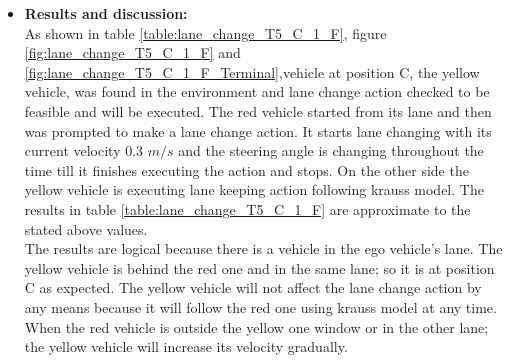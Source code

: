 \begin{enumerate}
\begin{itemize}
             \item \textbf{Results and discussion:} \\
                       As shown in table \ref{table:lane_change_T5_C_1_F}, figure \ref{fig:lane_change_T5_C_1_F} and \ref{fig:lane_change_T5_C_1_F_Terminal},vehicle at position C, the yellow vehicle, was found in the environment and lane change action checked to be feasible and will be executed. The red vehicle started from its lane and then was prompted to make a lane change action. It starts lane changing with its current velocity 0.3 \(m/s\) and the steering angle is changing throughout the time till it finishes executing the action and stops. On the other side the yellow vehicle is executing lane keeping action following krauss model. The results in table \ref{table:lane_change_T5_C_1_F} are approximate to the stated above values.\\
                        The results are logical because there is a vehicle in the ego vehicle's lane. The yellow vehicle is behind the red one and in the same lane; so it is at position C as expected. The yellow vehicle will not affect the lane change action by any means because it will follow the red one using krauss model at any time. When the red vehicle is outside the yellow one window or in the other lane; the yellow vehicle will increase its velocity gradually.\\




\end{itemize}
\end{enumerate}
